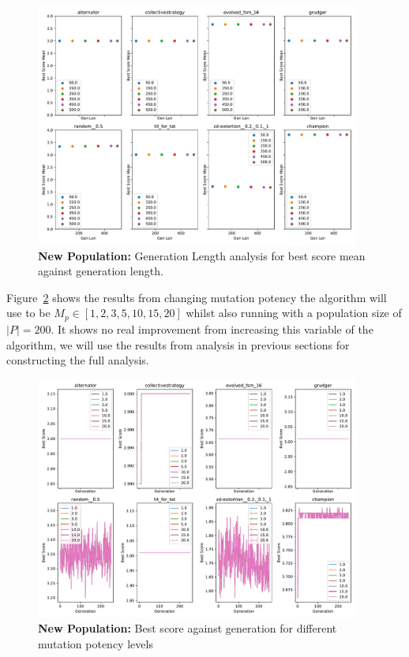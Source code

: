 \begin{figure}[ht]
    \includegraphics[width=0.95\textwidth, keepaspectratio, center]{./img/plots/NEW_GEN_bs_v_gen_all.pdf}
    \caption{\textbf{New Population:} Generation Length analysis for best score mean against generation length.}\label{fig:NEW-GEN-bs-v-gen-all}
\end{figure}

Figure~\ref{fig:NEW-MUT-POT-bs-v-gen-all} shows the results from changing mutation potency the algorithm will use to be \(M_p \in [1,2,3,5,10,15,20] \) whilst also running with a population size of \(|P|=200\).
It shows no real improvement from increasing this variable of the algorithm, we will use the results from analysis in previous sections for constructing the full analysis.

\begin{figure}[ht]
    \includegraphics[width=0.95\textwidth, keepaspectratio, center]{./img/plots/NEW_MUT_POT_bs_v_gen_all.pdf}
    \caption{\textbf{New Population:} Best score against generation for different mutation potency levels}\label{fig:NEW-MUT-POT-bs-v-gen-all}
\end{figure}

